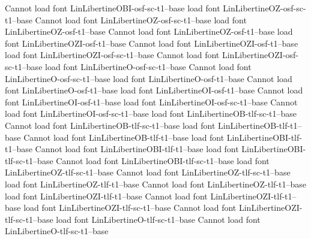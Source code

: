 {{{{{{{Cannot load font LinLibertineOBI-osf-sc-t1--base
load font	LinLibertineOZ-osf-sc-t1--base
Cannot load font LinLibertineOZ-osf-sc-t1--base
load font	LinLibertineOZ-osf-t1--base
Cannot load font LinLibertineOZ-osf-t1--base
load font	LinLibertineOZI-osf-t1--base
Cannot load font LinLibertineOZI-osf-t1--base
load font	LinLibertineOZI-osf-sc-t1--base
Cannot load font LinLibertineOZI-osf-sc-t1--base
load font	LinLibertineO-osf-sc-t1--base
Cannot load font LinLibertineO-osf-sc-t1--base
load font	LinLibertineO-osf-t1--base
Cannot load font LinLibertineO-osf-t1--base
load font	LinLibertineOI-osf-t1--base
Cannot load font LinLibertineOI-osf-t1--base
load font	LinLibertineOI-osf-sc-t1--base
Cannot load font LinLibertineOI-osf-sc-t1--base
load font	LinLibertineOB-tlf-sc-t1--base
Cannot load font LinLibertineOB-tlf-sc-t1--base
load font	LinLibertineOB-tlf-t1--base
Cannot load font LinLibertineOB-tlf-t1--base
load font	LinLibertineOBI-tlf-t1--base
Cannot load font LinLibertineOBI-tlf-t1--base
load font	LinLibertineOBI-tlf-sc-t1--base
Cannot load font LinLibertineOBI-tlf-sc-t1--base
load font	LinLibertineOZ-tlf-sc-t1--base
Cannot load font LinLibertineOZ-tlf-sc-t1--base
load font	LinLibertineOZ-tlf-t1--base
Cannot load font LinLibertineOZ-tlf-t1--base
load font	LinLibertineOZI-tlf-t1--base
Cannot load font LinLibertineOZI-tlf-t1--base
load font	LinLibertineOZI-tlf-sc-t1--base
Cannot load font LinLibertineOZI-tlf-sc-t1--base
load font	LinLibertineO-tlf-sc-t1--base
Cannot load font LinLibertineO-tlf-sc-t1--base
}}}}}}}

